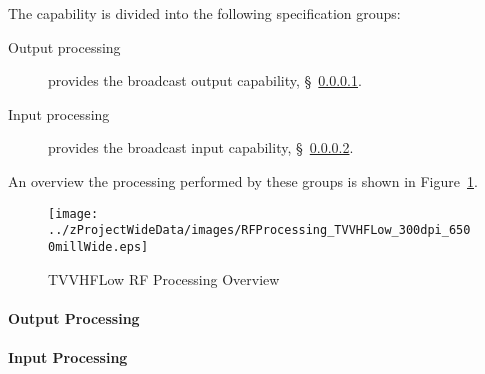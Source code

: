 The \ThisSys \ThisSegment \TVVHFLow capability is divided into the following specification groups:
\begin{description}
	\item[Output processing] provides the \TVVHFLow broadcast output capability, \S~\ref{loc:RF_TVVHFLow_Output}.
	\item[Input processing]  provides the \TVVHFLow broadcast input  capability, \S~\ref{loc:RF_TVVHFLow_Input}.
\end{description}
An overview the processing performed by these groups is shown in Figure~\ref{fig:TVVHFLow_RF_Processing}.
\begin{figure}[htbp]
	\centering
		\texttt{[image: ../zProjectWideData/images/RFProcessing\_TVVHFLow\_300dpi\_6500millWide.eps]}
	\caption[TVVHFLow RF Processing Overview]{TVVHFLow RF Processing Overview}
	\label{fig:TVVHFLow_RF_Processing}
\end{figure}

\KNEADPARAGRAPHNEWPAGE
\paragraph{\TVVHFLow \RF Output Processing}
\label{loc:RF_TVVHFLow_Output}
\renewcommand{\ThisSubSegment}{\TVVHFLow \RF Output Processing\xspace}%


\KNEADPARAGRAPHNEWPAGE
\paragraph{\TVVHFLow \RF Input Processing}
\label{loc:RF_TVVHFLow_Input}
\renewcommand{\ThisSubSegment}{\TVVHFLow \RF Input Processing\xspace}%

